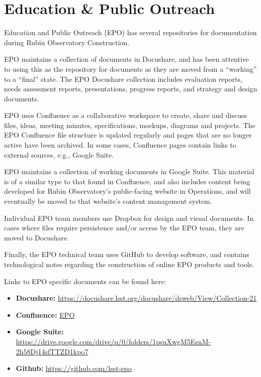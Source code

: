 \section{Education \& Public Outreach}

Education and Public Outreach (EPO) has several repositories for documentation during Rubin Observatory Construction.

EPO maintains a collection of documents in Docushare, and has been attentive to using this as the repository for documents as they are moved from a ``working'' to a ``final'' state.
The EPO Docushare collection includes evaluation reports, needs assessment reports, presentations, progress reports, and strategy and design documents.

EPO uses Confluence as a collaborative workspace to create, share and discuss files, ideas, meeting minutes, specifications, mockups, diagrams and projects.
The EPO Confluence file structure is updated regularly and pages that are no longer active have been archived.
In some cases, Confluence pages contain links to external sources, e.g., Google Suite.

EPO maintains a collection of working documents in Google Suite.
This material is of a similar type to that found in Confluence, and also includes content being developed for Rubin Observatory's public-facing website in Operations, and will eventually be moved to that website's content management system.

Individual EPO team members use Dropbox for design and visual documents.
In cases where files require persistence and/or access by the EPO team, they are moved to Docushare.

Finally, the EPO technical team uses GitHub to develop software, and contains technological notes regarding the construction of online EPO products and tools.

Links to EPO specific documents can be found here:

\begin{itemize}

	\item {\bf Docushare:}  \url{https://docushare.lsst.org/docushare/dsweb/View/Collection-21}
	\item {\bf Confluence:} \href{https://confluence.lsstcorp.org/pages/viewpage.action?pageId=25690606}{EPO}
	\item {\bf Google Suite:}  \url{https://drive.google.com/drive/u/0/folders/1psuXwgM5EsnM-2h58Dj14sfTTZD1kpo7}
	\item {\bf Github:} \url{https://github.com/lsst-epo}
	
\end{itemize}
